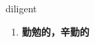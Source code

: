 
\begin{frame}
{\huge diligent}
\begin{center}
\begin{enumerate}\Large
  \item \textbf{勤勉的，辛勤的}
\end{enumerate}
\end{center}
\end{frame}
